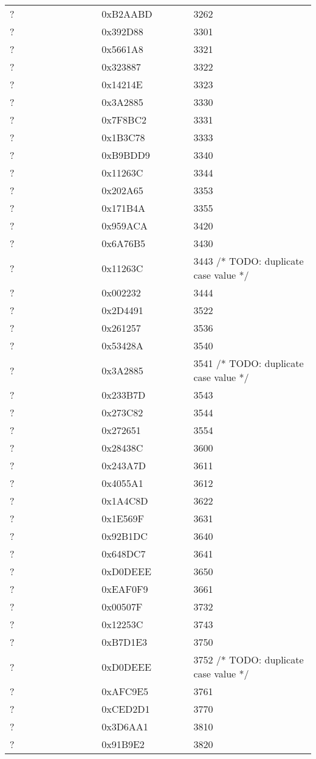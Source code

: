 \begin{longtable}{p{0.3\linewidth} p{0.3\linewidth} p{0.4\linewidth}}
? &  0xB2AABD &  3262\\
? &  0x392D88 &  3301\\
? &  0x5661A8 &  3321\\
? &  0x323887 &  3322\\
? &  0x14214E &  3323\\
? &  0x3A2885 &  3330\\
? &  0x7F8BC2 &  3331\\
? &  0x1B3C78 &  3333\\
? &  0xB9BDD9 &  3340\\
? &  0x11263C &  3344\\
? &  0x202A65 &  3353\\
? &  0x171B4A &  3355\\
? &  0x959ACA &  3420\\
? &  0x6A76B5 &  3430\\
? &  0x11263C &  3443 /* TODO: duplicate case value */\\
? &  0x002232 &  3444\\
? &  0x2D4491 &  3522\\
? &  0x261257 &  3536\\
? &  0x53428A &  3540\\
? &  0x3A2885 &  3541 /* TODO: duplicate case value */\\
? &  0x233B7D &  3543\\
? &  0x273C82 &  3544\\
? &  0x272651 &  3554\\
? &  0x28438C &  3600\\
? &  0x243A7D &  3611\\
? &  0x4055A1 &  3612\\
? &  0x1A4C8D &  3622\\
? &  0x1E569F &  3631\\
? &  0x92B1DC &  3640\\
? &  0x648DC7 &  3641\\
? &  0xD0DEEE &  3650\\
? &  0xEAF0F9 &  3661\\
? &  0x00507F &  3732\\
? &  0x12253C &  3743\\
? &  0xB7D1E3 &  3750\\
? &  0xD0DEEE &  3752 /* TODO: duplicate case value */\\
? &  0xAFC9E5 &  3761\\
? &  0xCED2D1 &  3770\\
? &  0x3D6AA1 &  3810\\
? &  0x91B9E2 &  3820\\

\end{longtable}
